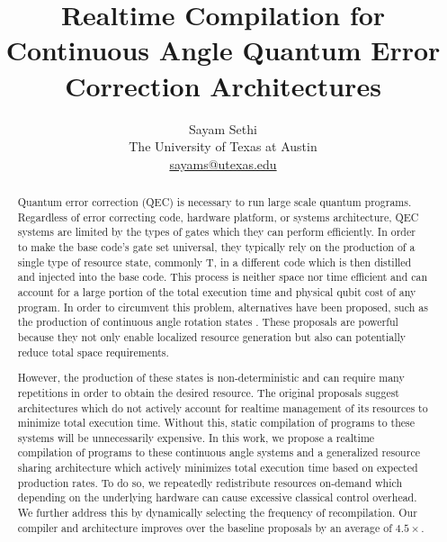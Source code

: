 \documentclass[nonacm,sigplan]{acmart}
\begin{document}
\title{Realtime Compilation for Continuous Angle Quantum Error Correction Architectures}
\author{Sayam Sethi\\The University of Texas at Austin\\\href{mailto:sayams@utexas.edu}{sayams@utexas.edu}}


\begin{abstract}
Quantum error correction (QEC) is necessary to run large scale quantum programs. Regardless of error correcting code, hardware platform, or systems architecture, QEC systems are limited by the types of gates which they can perform efficiently. In order to make the base code's gate set universal, they typically rely on the production of a single type of resource state, commonly T, in a different code which is then distilled and injected into the base code. This process is neither space nor time efficient and can account for a large portion of the total execution time and physical qubit cost of any program. In order to circumvent this problem, alternatives have been proposed, such as the production of continuous angle rotation states \cite{akahoshi2023partially, ding2018magic}. These proposals are powerful because they not only enable localized resource generation but also can potentially reduce total space requirements. 

However, the production of these states is non-deterministic and can require many repetitions in order to obtain the desired resource. The original proposals suggest architectures which do not actively account for realtime management of its resources to minimize total execution time. Without this, static compilation of programs to these systems will be unnecessarily expensive. In this work, we propose a realtime compilation of programs to these continuous angle systems and a generalized resource sharing architecture which actively minimizes total execution time based on expected production rates. To do so, we repeatedly redistribute resources on-demand which depending on the underlying hardware can cause excessive classical control overhead. We further address this by dynamically selecting the frequency of recompilation. Our compiler and architecture improves over the baseline proposals by an average of $4.5\times$.
\end{abstract}

\maketitle %
\pagestyle{plain} %
\end{document}
